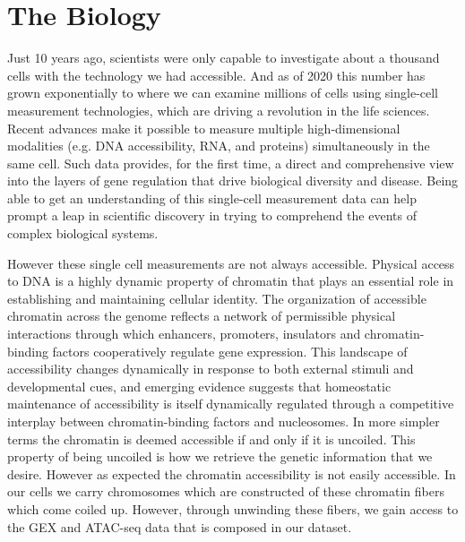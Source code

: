 \section{The Biology}

Just 10 years ago, scientists were only capable to investigate about a thousand cells with the technology we had accessible. 
And as of 2020 this number has grown exponentially to where we can examine millions of cells using single-cell measurement technologies, which are driving a revolution in the life sciences. 
Recent advances make it possible to measure multiple high-dimensional modalities (e.g. DNA accessibility, RNA, and proteins) simultaneously in the same cell. Such data provides, for the first time, a direct and comprehensive view into the layers of gene regulation that drive biological diversity and disease. 
Being able to get an understanding of this single-cell measurement data can help prompt a leap in scientific discovery in trying to comprehend the events of complex biological systems. 

However these single cell measurements are not always accessible. Physical access to DNA is a highly dynamic property of chromatin that plays an essential role in establishing and maintaining cellular identity. The organization of accessible chromatin across the genome reflects a network of permissible physical interactions through which enhancers, promoters, insulators and chromatin-binding factors cooperatively regulate gene expression. This landscape of accessibility changes dynamically in response to both external stimuli and developmental cues, and emerging evidence suggests that homeostatic maintenance of accessibility is itself dynamically regulated through a competitive interplay between chromatin-binding factors and nucleosomes. In more simpler terms the chromatin is deemed accessible if and only if it is uncoiled. This property of being uncoiled is how we retrieve the genetic information that we desire. However as expected the chromatin accessibility is not easily accessible. In our cells we carry chromosomes which are constructed of these chromatin fibers which come coiled up. However, through unwinding these fibers, we gain access to the GEX and ATAC-seq data that is composed in our dataset.


